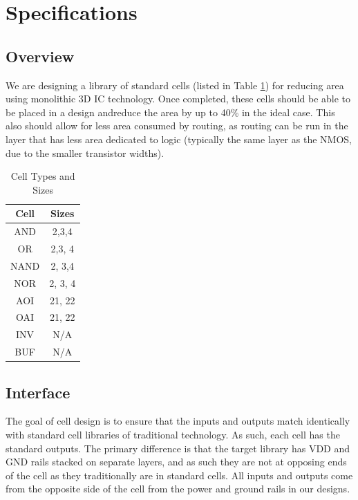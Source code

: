 \documentclass{article}
\begin{document}
\section{Specifications}
\subsection{Overview} We are designing a library of standard cells (listed in Table \ref{tab:cell_table}) for reducing area using monolithic 3D IC technology. Once completed, these cells should be able to be placed in a design andreduce the area by up to 40\% in the ideal case. This also should allow for less area consumed by routing, as routing can be run in the layer that has less area dedicated to logic (typically the same layer as the NMOS, due to the smaller transistor widths).

\begin{table}[h]
\centering
\begin{tabular}{|c|c|} 
\hline
Cell & Sizes \\ \hline
AND & 2,3,4 \\ \hline
OR & 2,3, 4\\ \hline
NAND & 2, 3,4 \\ \hline
NOR & 2, 3, 4\\ \hline
AOI & 21, 22 \\ \hline
OAI & 21, 22 \\ \hline
INV & N/A \\ \hline
BUF & N/A \\ \hline
\end{tabular}
\caption{Cell Types and Sizes}
\label{tab:cell_table}
\end{table}

\subsection{Interface} The goal of cell design is to ensure that the inputs and outputs match identically with standard cell libraries of traditional technology. As such, each cell has the standard outputs. The primary difference is that the target library has VDD and GND rails stacked on separate layers, and as such they are not at opposing ends of the cell as they traditionally are in standard cells. All inputs and outputs come from the opposite side of the cell from the power and ground rails in our designs. 
\end{document}
